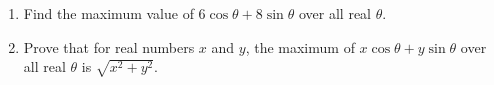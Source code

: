 \begin{enumerate}
\item[(a)] Find the maximum value of $6\cos\theta+8\sin\theta$ over all real $\theta$.
\item[(b)] Prove that for real numbers $x$ and $y$, the maximum of $x\cos\theta+y\sin\theta$ over all real $\theta$ is $\sqrt{x^2+y^2}$.
\end{enumerate}
